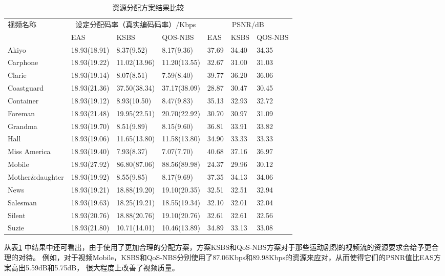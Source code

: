 \begin{table}[tb]
    \wuhao
    \centering
    \caption{资源分配方案结果比较}
    \begin{tabular*}{\textwidth}{p{3cm}llp{2.5cm}lll}
    \toprule
    视频名称 & \multicolumn{3}{c}{设定分配码率（真实编码码率）/Kbps} &  \multicolumn{3}{c}{PSNR/dB} \\
    \cmidrule{2-7}
             &  EAS & KSBS & QOS-NBS&  EAS & KSBS & QOS-NBS \\
    \midrule
Akiyo                & 18.93(18.91)& 8.37(9.52)&8.17(9.36)  &37.69  &34.40  &34.35 \\ 
Carphone             & 18.93(19.22)& 11.02(13.96)&11.20(13.55)  &32.67  &31.00  &31.03 \\ 
Clarie               & 18.93(19.14)& 8.07(8.51)&7.59(8.40)  &39.77  &36.20  &36.06 \\ 
Coastguard           & 18.93(21.36)& 37.50(38.34)&37.17(38.09)  &28.87  &30.47  &30.45 \\ 
Container            & 18.93(19.12)& 8.93(10.50)&8.47(9.83)  &35.13  &32.93  &32.72 \\ 
Foreman              & 18.93(21.48)& 19.95(22.51)&20.70(22.92)  &30.70  &30.97  &31.09 \\ 
Grandma              & 18.93(19.70)& 8.51(9.89)&8.15(9.60)  &36.81  &33.91  &33.82 \\ 
Hall                 & 18.93(19.06)& 11.65(13.80)&11.58(13.80)  &34.90  &33.33  &33.33 \\ 
Miss America         & 18.93(19.40)& 7.93(8.37)&7.07(7.70)  &40.68  &37.16  &36.97 \\ 
Mobile               & 18.93(27.92)& 86.80(87.06)&88.56(89.98)  &24.37  &29.96  &30.12 \\ 
Mother\&daughter     & 18.93(19.92)& 8.55(9.85)&8.17(9.69)  &37.35  &34.13  &34.06 \\ 
News                 & 18.93(19.21)& 18.88(19.20)&19.10(20.35)  &32.51  &32.51  &32.94 \\ 
Salesman             & 18.93(19.63)& 18.25(19.21)&18.55(19.34)  &32.10  &32.01  &32.04 \\ 
Silent               & 18.93(20.76)& 18.88(20.76)&19.10(20.76)  &32.61  &32.61  &32.56 \\ 
Suzie                & 18.93(21.80)& 10.71(14.01)&10.46(13.89)  &34.89  &33.13  &33.08 \\ 
\bottomrule
    \end{tabular*}
    \label{tab:chap_nash:resource_allocation_comparision}
\end{table}
从表\ref{tab:chap_nash:resource_allocation_comparision} 中结果中还可看出，由于使用了更加合理的分配方案，方案KSBS和QoS-NBS方案对于那些运动剧烈的视频流的资源要求会给予更合理的对待。
例如，对于视频Mobile，KSBS和QoS-NBS分别使用了87.06Kbps和89.98Kbps的资源来应对，从而使得它们的PSNR值比EAS方案高出5.59dB和5.75dB，
很大程度上改善了视频质量。


